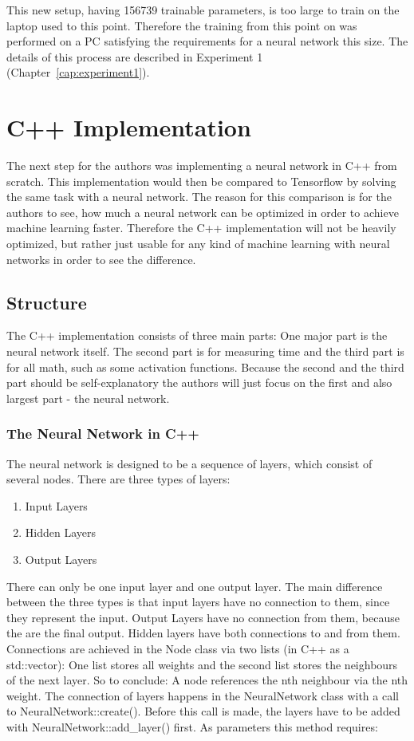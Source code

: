 This new setup, having 156739 trainable parameters, is too large to train on the laptop used to this point. Therefore the training from this point on was performed on a PC satisfying the requirements for a neural network this size. The details of this process are described in Experiment 1 (Chapter~\ref{cap:experiment1}).

\section{C++ Implementation}

The next step for the authors was implementing a neural network in C++ from scratch. This implementation would then be compared to Tensorflow by solving the same task with a neural network. The reason for this comparison is for the authors to see, how much a neural network can be optimized in order to achieve machine learning faster. Therefore the C++ implementation will not be heavily optimized, but rather just usable for any kind of machine learning with neural networks in order to see the difference.

\subsection{Structure}

The C++ implementation consists of three main parts: One major part is the neural network itself. The second part is for measuring time and the third part is for all math, such as some activation functions. Because the second and the third part should be self-explanatory the authors will just focus on the first and also largest part - the neural network.

\subsubsection{The Neural Network in C++}

The neural network is designed to be a sequence of layers, which consist of several nodes. There are three types of layers:

\begin{enumerate}
	\item Input Layers
	\item Hidden Layers
	\item Output Layers
\end{enumerate}

There can only be one input layer and one output layer. The main difference between the three types is that input layers have no connection to them, since they represent the input. Output Layers have no connection from them, because the are the final output. Hidden layers have both connections to and from them. Connections are achieved in the Node class via two lists (in C++ as a std::vector): One list stores all weights and the second list stores the neighbours of the next layer. 
\newline
So to conclude: A node references the nth neighbour via the nth weight. The connection of layers happens in the NeuralNetwork class with a call to NeuralNetwork::create(). Before this call is made, the layers have to be added with NeuralNetwork::add\_layer() first. As parameters this method requires:

